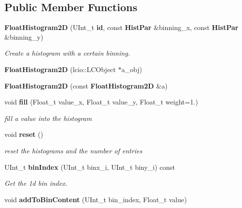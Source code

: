 \subsection*{Public Member Functions}
\begin{DoxyCompactItemize}
\item 
{\bf Float\-Histogram2\-D} (U\-Int\-\_\-t {\bf id}, const {\bf Hist\-Par} \&binning\-\_\-x, const {\bf Hist\-Par} \&binning\-\_\-y)
\begin{DoxyCompactList}\small\item\em Create a histogram with a certain binning. \end{DoxyCompactList}\item 
{\bfseries Float\-Histogram2\-D} (lcio\-::\-L\-C\-Object $\ast$a\-\_\-obj)\label{classhistmgr_1_1FloatHistogram2D_ab0dea4b3d379cdb854036719674e71d4}

\item 
{\bfseries Float\-Histogram2\-D} (const {\bf Float\-Histogram2\-D} \&a)\label{classhistmgr_1_1FloatHistogram2D_a68f0f15e037cb32f3d77d6f0984ee3b4}

\item 
void {\bf fill} (Float\-\_\-t value\-\_\-x, Float\-\_\-t value\-\_\-y, Float\-\_\-t weight=1.)\label{classhistmgr_1_1FloatHistogram2D_aa817630a68b7456960a13d984032fce6}

\begin{DoxyCompactList}\small\item\em fill a value into the histogram \end{DoxyCompactList}\item 
void {\bf reset} ()\label{classhistmgr_1_1FloatHistogram2D_ad3fdcad04762ab70fa346e23d7190b97}

\begin{DoxyCompactList}\small\item\em reset the histograms and the number of entries \end{DoxyCompactList}\item 
U\-Int\-\_\-t {\bf bin\-Index} (U\-Int\-\_\-t binx\-\_\-i, U\-Int\-\_\-t biny\-\_\-i) const \label{classhistmgr_1_1FloatHistogram2D_a220db5ab33a4a99a3c1cef4a20b0906c}

\begin{DoxyCompactList}\small\item\em Get the 1d bin index. \end{DoxyCompactList}\item 
void {\bf add\-To\-Bin\-Content} (U\-Int\-\_\-t bin\-\_\-index, Float\-\_\-t value)\label{classhistmgr_1_1FloatHistogram2D_a15daa23f7a152fa7b66aa9615aaa5178}


\end{DoxyCompactItemize}
